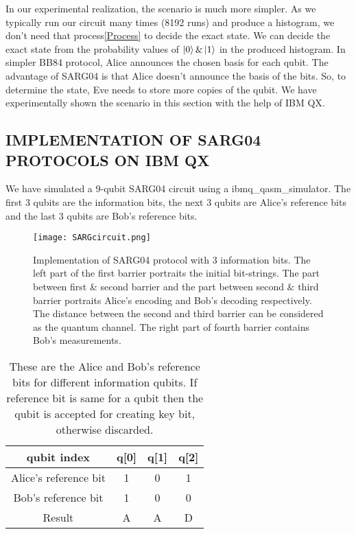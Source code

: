 \documentclass[superscriptaddress,twocolumn,showpacs,prb,floatfix]{revtex4}
\begin{document}
In our experimental realization, the scenario is much more simpler. As we typically run our circuit many times (8192 runs) and produce a histogram, we don't need that process\ref{Process} to decide the exact state. We can decide the exact state from the probability values of $\ket{0} \& \ket{1}$ in the produced histogram.
In simpler BB84 protocol, Alice announces the chosen basis for each qubit.  The advantage of SARG04 is that Alice doesn't announce the basis of the bits. So, to determine the state, Eve needs to store more copies of the qubit. We have experimentally shown the scenario in this section with the help of IBM QX.
\subsection{IMPLEMENTATION OF SARG04 PROTOCOLS ON IBM QX}
\label{SecIIIA}
We have simulated a 9-qubit SARG04 circuit using a ibmq\_qasm\_simulator. The first 3 qubits are the information bits, the next 3 qubits are Alice's reference bits and the last 3 qubits are Bob's reference bits. 
\begin{figure}[H]
    \centering
    \texttt{[image: SARGcircuit.png]}
    \caption{Implementation of SARG04 protocol with 3 information bits. The left part of the first barrier portraits the initial bit-strings. The part between first \& second barrier and the part between second \& third barrier portraits Alice's encoding and Bob's decoding respectively. The distance between the second and third barrier can be considered as the quantum channel. The right part of fourth barrier contains Bob's measurements.}
    \label{SARGcircuit}
\end{figure}
\begin{table}[ht]
    \centering
    \begin{tabular}{|c|c|c|c|}
    \hline
    \hline
    qubit index & q[0] & q[1] & q[2] \\[0.5ex]
    \hline
    Alice's reference bit & 1 & 0 & 1 \\[0.5ex]
    \hline
    Bob's reference bit & 1 & 0 & 0 \\[0.5ex]
    \hline
    Result & A & A & D \\[0.5ex]
    \hline
    \end{tabular}
    \caption{These are the Alice and Bob's reference bits for different information qubits. If reference bit is same for a qubit then the qubit is accepted for creating key bit, otherwise discarded.}
    \label{qkdtable8}
\end{table}
\end{document}
